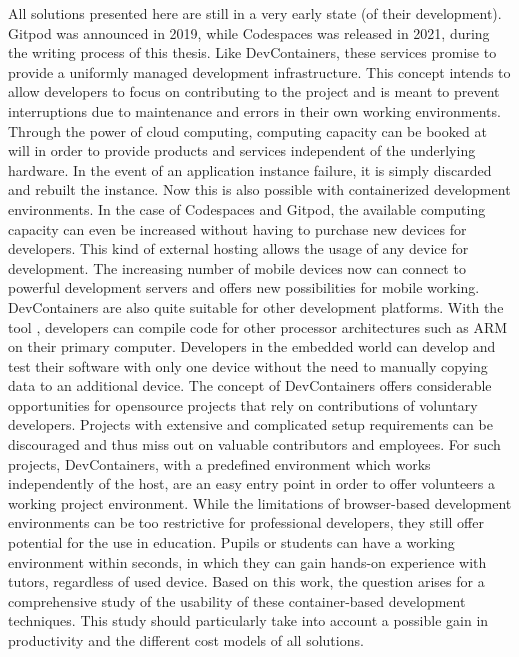 All solutions presented here are still in a very early state (of their development). Gitpod was announced in 2019, while Codespaces was released in 2021, during the writing process of this thesis. Like DevContainers, these services promise to provide a uniformly managed development infrastructure. This concept intends to allow developers to focus on contributing to the project and is meant to prevent interruptions due to maintenance and errors in their own working environments. Through the power of cloud computing, computing capacity can be booked at will in order to provide products and services independent of the underlying hardware. In the event of an application instance failure, it is simply discarded and rebuilt the instance. Now this is also possible with containerized development environments. In the case of Codespaces and Gitpod, the available computing capacity can even be increased without having to purchase new devices for developers. This kind of external hosting allows the usage of any device for development. The increasing number of mobile devices now can connect to powerful development servers and offers new possibilities for mobile working. DevContainers are also quite suitable for other development platforms. With the tool , developers can compile code for other processor architectures such as ARM on their primary computer. Developers in the embedded world can develop and test their software with only one device without the need to manually copying data to an additional device.\newline
The concept of DevContainers offers considerable opportunities for opensource projects that rely on contributions of voluntary developers. Projects with extensive and complicated setup requirements can be discouraged and thus miss out on valuable contributors and employees. For such projects, DevContainers, with a predefined environment which works independently of the host, are an easy entry point in order to offer volunteers a working project environment. While the limitations of browser-based development environments can be too restrictive for professional developers, they still offer potential for the use in education. Pupils or students can have a working environment within seconds, in which they can gain hands-on experience with tutors, regardless of used device.\newline
Based on this work, the question arises for a comprehensive study of the usability of these container-based development techniques. This study should particularly take into account a possible gain in productivity and the different cost models of all solutions.
